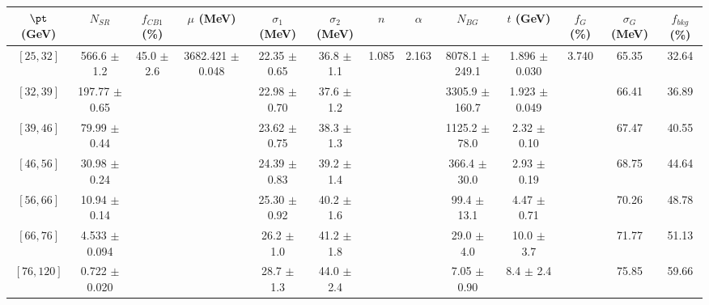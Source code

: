 \begin{tabular}{c||c|c|c|c|c|c|c|c|c|c|c||c}
$\pt$ (GeV) & $N_{SR}$ & $f_{CB1}$ (\%) & $\mu$ (MeV) & $\sigma_1$ (MeV) & $\sigma_2$ (MeV) & $n$ & $\alpha$ & $N_{BG}$ & $t$ (GeV) & $f_G$ (\%) & $\sigma_G$ (MeV) & $f_{bkg}$ (\%) \\
\hline
$[25, 32]$ & 566.6 $\pm$ 1.2 & \multirow{7}{*}{45.0 $\pm$ 2.6} & \multirow{7}{*}{3682.421 $\pm$ 0.048} & 22.35 $\pm$ 0.65 & 36.8 $\pm$ 1.1 & \multirow{7}{*}{1.085} & \multirow{7}{*}{2.163} & 8078.1 $\pm$ 249.1 & 1.896 $\pm$ 0.030 & \multirow{7}{*}{3.740} & 65.35 & 32.64\\
$[32, 39]$ & 197.77 $\pm$ 0.65 &  &  & 22.98 $\pm$ 0.70 & 37.6 $\pm$ 1.2 &  &  & 3305.9 $\pm$ 160.7 & 1.923 $\pm$ 0.049 &  & 66.41 & 36.89\\
$[39, 46]$ & 79.99 $\pm$ 0.44 &  &  & 23.62 $\pm$ 0.75 & 38.3 $\pm$ 1.3 &  &  & 1125.2 $\pm$ 78.0 & 2.32 $\pm$ 0.10 &  & 67.47 & 40.55\\
$[46, 56]$ & 30.98 $\pm$ 0.24 &  &  & 24.39 $\pm$ 0.83 & 39.2 $\pm$ 1.4 &  &  & 366.4 $\pm$ 30.0 & 2.93 $\pm$ 0.19 &  & 68.75 & 44.64\\
$[56, 66]$ & 10.94 $\pm$ 0.14 &  &  & 25.30 $\pm$ 0.92 & 40.2 $\pm$ 1.6 &  &  & 99.4 $\pm$ 13.1 & 4.47 $\pm$ 0.71 &  & 70.26 & 48.78\\
$[66, 76]$ & 4.533 $\pm$ 0.094 &  &  & 26.2 $\pm$ 1.0 & 41.2 $\pm$ 1.8 &  &  & 29.0 $\pm$ 4.0 & 10.0 $\pm$ 3.7 &  & 71.77 & 51.13\\
$[76, 120]$ & 0.722 $\pm$ 0.020 &  &  & 28.7 $\pm$ 1.3 & 44.0 $\pm$ 2.4 &  &  & 7.05 $\pm$ 0.90 & 8.4 $\pm$ 2.4 &  & 75.85 & 59.66\\
\end{tabular}
